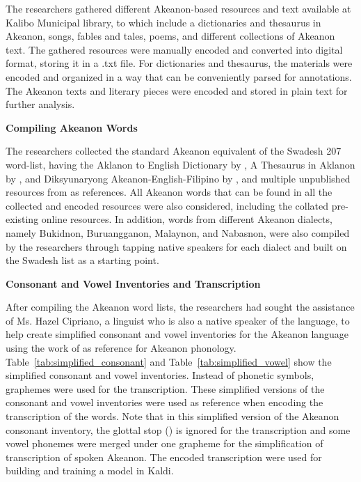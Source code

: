 The researchers gathered different Akeanon-based resources and text available at Kalibo Municipal library, to which include a dictionaries and thesaurus in Akeanon, songs, fables and tales, poems, and different collections of Akeanon text. The gathered resources were manually encoded and converted into digital format, storing it in a .txt file. For dictionaries and thesaurus, the materials were encoded and organized in a way that can be conveniently parsed for annotations. The Akeanon texts and literary pieces were encoded and stored in plain text for further analysis.

\textbf{Compiling Akeanon Words}

The researchers collected the standard Akeanon equivalent of the Swadesh 207 word-list, having the Aklanon to English Dictionary by , A Thesaurus in Aklanon by , and Diksyunaryong Akeanon-English-Filipino by , and multiple unpublished resources from  as references. All Akeanon words that can be found in all the collected and encoded resources were also considered, including the collated pre-existing online resources. In addition, words from different Akeanon dialects, namely Bukidnon, Buruangganon, Malaynon, and Nabasnon, were also compiled by the researchers through tapping native speakers for each dialect and built on the Swadesh list as a starting point. 

\textbf{Consonant and Vowel Inventories and Transcription}

After compiling the Akeanon word lists, the researchers had sought the assistance of Ms. Hazel Cipriano, a linguist who is also a native speaker of the language, to help create simplified  consonant and vowel inventories for the Akeanon language using the work of  as reference for Akeanon phonology. Table~\ref{tab:simplified_consonant} and Table~\ref{tab:simplified_vowel} show the simplified consonant and vowel inventories. Instead of phonetic symbols, graphemes were used for the transcription. These simplified versions of the consonant and vowel inventories were used as reference when encoding the transcription of the words. Note that in this simplified version of the Akeanon consonant inventory, the glottal stop () is ignored for the transcription and some vowel phonemes were merged under one grapheme for the simplification of transcription of spoken Akeanon. The encoded transcription were used for building and training a model in Kaldi.

